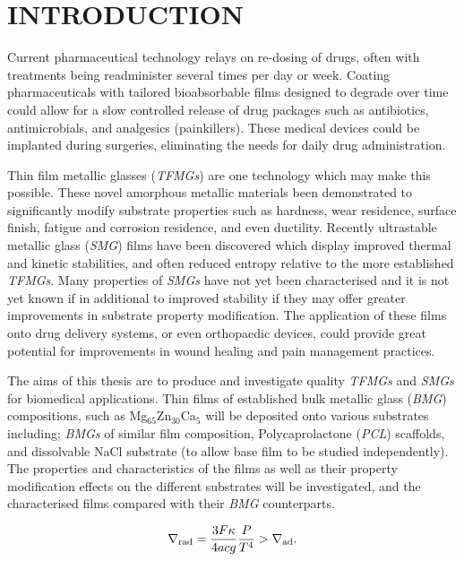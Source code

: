 \section{INTRODUCTION }

Current pharmaceutical technology relays on re-dosing of drugs, often with treatments being readminister several times per day or week. Coating pharmaceuticals with tailored bioabsorbable films designed to degrade over time could allow for a slow controlled release of drug packages such as antibiotics, antimicrobials, and analgesics (painkillers). These medical devices could be implanted during surgeries, eliminating the needs for daily drug administration.  

Thin film metallic glasses (\textit{TFMGs}) are one technology which may make this possible. These novel amorphous metallic materials been demonstrated to significantly modify substrate properties such as hardness, wear residence, surface finish, fatigue and corrosion residence, and even ductility. Recently ultrastable metallic glass (\textit{SMG}) films have been discovered which display improved thermal and kinetic stabilities, and often reduced entropy relative to the more established \textit{TFMGs}. Many properties of \textit{SMGs} have not yet been characterised and it is not yet known if in additional to improved stability if they may offer greater improvements in substrate property modification. The application of these films onto drug delivery systems, or even orthopaedic devices, could provide great potential for improvements in wound healing and pain management practices.

The aims of this thesis are to produce and investigate quality \textit{TFMGs} and \textit{SMGs} for biomedical applications. Thin films of established bulk metallic glass (\textit{BMG}) compositions, such as Mg$_{65}$Zn$_{30}$Ca$_{5}$ will be deposited onto various substrates including; \textit{BMGs} of similar film composition, Polycaprolactone (\textit{PCL}) scaffolds, and dissolvable NaCl substrate (to allow base film to be studied independently). The properties and characteristics of the films as well as their property modification effects on the different substrates will be investigated, and the characterised films compared with their \textit{BMG} counterparts. 

\begin{equation}
\nabla_{\rm rad} = \frac{3F\kappa}{4acg}\frac{P}{T^4} > \nabla_{\rm ad}.
\end{equation}

\authorea
